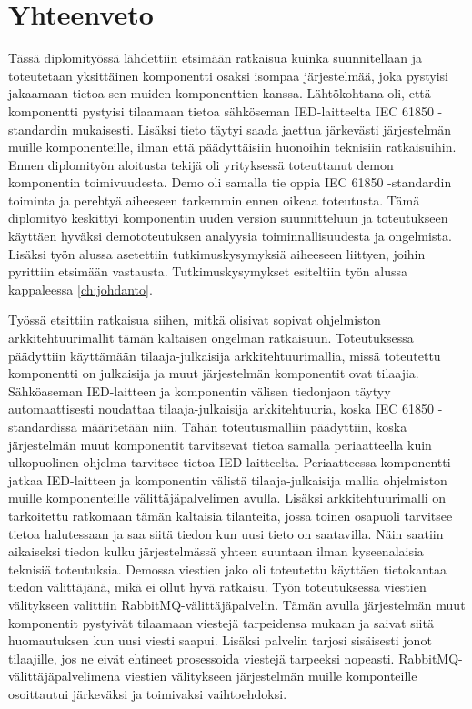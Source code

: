 \chapter{Yhteenveto}
\label{ch:yhteenveto}
Tässä diplomityössä lähdettiin etsimään ratkaisua kuinka suunnitellaan ja toteutetaan yksittäinen komponentti osaksi isompaa järjestelmää, joka pystyisi jakaamaan tietoa sen muiden komponenttien kanssa. Lähtökohtana oli, että komponentti pystyisi tilaamaan tietoa sähköseman IED-laitteelta IEC 61850 -standardin mukaisesti. Lisäksi tieto täytyi saada jaettua järkevästi järjestelmän muille komponenteille, ilman että päädyttäisiin huonoihin teknisiin ratkaisuihin. Ennen diplomityön aloitusta tekijä oli yrityksessä toteuttanut demon komponentin toimivuudesta. Demo oli samalla tie oppia IEC 61850 -standardin toiminta ja perehtyä aiheeseen tarkemmin ennen oikeaa toteutusta. Tämä diplomityö keskittyi komponentin uuden version suunnitteluun ja toteutukseen käyttäen hyväksi demototeutuksen analyysia toiminnallisuudesta ja ongelmista. Lisäksi työn alussa asetettiin tutkimuskysymyksiä aiheeseen liittyen, joihin pyrittiin etsimään vastausta. Tutkimuskysymykset esiteltiin työn alussa kappaleessa \ref{ch:johdanto}.

Työssä etsittiin ratkaisua siihen, mitkä olisivat sopivat ohjelmiston arkkitehtuurimallit tämän kaltaisen ongelman ratkaisuun. Toteutuksessa päädyttiin käyttämään tilaaja-julkaisija arkkitehtuurimallia, missä toteutettu komponentti on julkaisija ja muut järjestelmän komponentit ovat tilaajia. Sähköaseman IED-laitteen ja komponentin välisen tiedonjaon täytyy automaattisesti noudattaa tilaaja-julkaisija arkkitehtuuria, koska IEC 61850 -stan\-dar\-dis\-sa määritetään niin. Tähän toteutusmalliin päädyttiin, koska järjestelmän muut komponentit tarvitsevat tietoa samalla periaatteella kuin ulkopuolinen ohjelma tarvitsee tietoa IED-laitteelta. Periaatteessa komponentti jatkaa IED-laitteen ja komponentin välistä tilaaja-julkaisija mallia ohjelmiston muille komponenteille välittäjäpalvelimen avulla. Lisäksi arkkitehtuurimalli on tarkoitettu ratkomaan tämän kaltaisia tilanteita, jossa toinen osapuoli tarvitsee tietoa halutessaan ja saa siitä tiedon kun uusi tieto on saatavilla. Näin saatiin aikaiseksi tiedon kulku järjestelmässä yhteen suuntaan ilman kyseenalaisia teknisiä toteutuksia. Demossa viestien jako oli toteutettu käyttäen tietokantaa tiedon välittäjänä, mikä ei ollut hyvä ratkaisu. Työn toteutuksessa viestien välitykseen valittiin RabbitMQ-välittäjäpalvelin. Tämän avulla järjestelmän muut komponentit pystyivät tilaamaan viestejä tarpeidensa mukaan ja saivat siitä huomautuksen kun uusi viesti saapui. Lisäksi palvelin tarjosi sisäisesti jonot tilaajille, jos ne eivät ehtineet prosessoida viestejä tarpeeksi nopeasti. RabbitMQ-välittäjäpalvelimena viestien välitykseen järjestelmän muille komponteille osoittautui järkeväksi ja toimivaksi vaihtoehdoksi.

